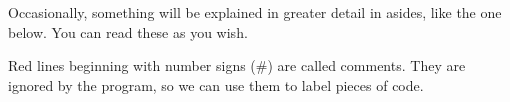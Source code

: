 Occasionally, something will be explained in greater detail in asides, like the one below. You can read these as you wish.
	
\begin{aside}[Comments]
	Red lines beginning with number signs (\#) are called comments.
	They are ignored by the program, so we can use them to label pieces of code.
\end{aside}